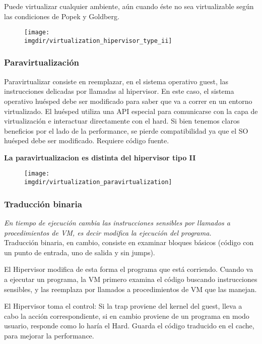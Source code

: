 \documentclass[a4paper, twoside]{article}
\newcommand{\imgdir}{../resources/images} %
\begin{document}
Puede virtualizar cualquier ambiente, aún cuando éste no sea virtualizable según las condiciones de Popek y Goldberg.

\begin{figure}[H]
	\centering
	\texttt{[image: \\imgdir/virtualization\_hipervisor\_type\_ii]}
	\label{fig:virtualizacion_hipervisor_tipo_ii}
\end{figure}

\subsubsection{Paravirtualización}
Paravirtualizar consiste en reemplazar, en el sistema operativo guest, las instrucciones delicadas por llamadas al hipervisor. En este caso, el sistema operativo huésped debe ser modificado para saber que va a correr en un entorno virtualizado. El huésped utiliza una API especial para comunicarse con la capa de virtualización e interactuar directamente con el hard. Si bien tenemos claros beneficios por el lado de la performance, se pierde compatibilidad ya que el SO huésped debe ser modificado. Requiere código fuente.

\textbf{La paravirtualizacion es distinta del hipervisor tipo II}

\begin{figure}[H]
	\centering
	\texttt{[image: \\imgdir/virtualization\_paravirtualization]}
	\label{fig:virtualizacion_paravirtualization}
\end{figure}

\subsubsection{Traducción binaria}
\textit{En tiempo de ejecución cambia las instrucciones sensibles por llamados a procedimientos de VM, es decir modifica la ejecución del programa.}\\

Traducción binaria, en cambio, consiste en examinar bloques básicos (código con un punto de entrada, uno de salida y sin jumps).

El Hipervisor modifica de esta forma el programa que está corriendo. Cuando va a ejecutar un programa, la VM primero examina el código buscando instrucciones sensibles, y las reemplaza por llamados a procedimientos de VM que las manejan.

El Hipervisor toma el control: Si la trap proviene del kernel del guest, lleva a cabo la acción correspondiente, si en cambio proviene de un programa en modo usuario, responde como lo haría el Hard.
Guarda el código traducido en el cache, para mejorar la performance.
\end{document}
